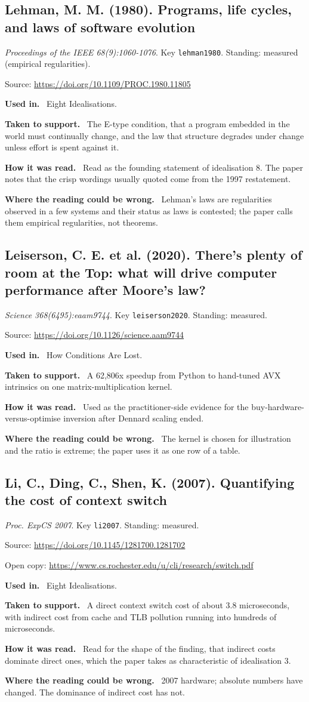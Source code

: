 \documentclass[11pt,oneside]{article}
\newcommand{\field}[1]{\par\noindent\textbf{\color{accent}#1.}\ }
\begin{document}
\subsection*{Lehman, M. M. (1980). Programs, life cycles, and laws of software evolution}
\noindent\small\emph{Proceedings of the IEEE 68(9):1060-1076}. Key \texttt{lehman1980}. Standing: measured (empirical regularities).
\par\noindent\small Source: \url{https://doi.org/10.1109/PROC.1980.11805}
\normalsize
\field{Used in} Eight Idealisations.
\field{Taken to support} The E-type condition, that a program embedded in the world must continually change, and the law that structure degrades under change unless effort is spent against it.
\field{How it was read} Read as the founding statement of idealisation 8. The paper notes that the crisp wordings usually quoted come from the 1997 restatement.
\field{Where the reading could be wrong} Lehman's laws are regularities observed in a few systems and their status as laws is contested; the paper calls them empirical regularities, not theorems.

\hypertarget{src:leiserson2020}{}
\subsection*{Leiserson, C. E. et al. (2020). There's plenty of room at the Top: what will drive computer performance after Moore's law?}
\noindent\small\emph{Science 368(6495):eaam9744}. Key \texttt{leiserson2020}. Standing: measured.
\par\noindent\small Source: \url{https://doi.org/10.1126/science.aam9744}
\normalsize
\field{Used in} How Conditions Are Lost.
\field{Taken to support} A 62,806x speedup from Python to hand-tuned AVX intrinsics on one matrix-multiplication kernel.
\field{How it was read} Used as the practitioner-side evidence for the buy-hardware-versus-optimise inversion after Dennard scaling ended.
\field{Where the reading could be wrong} The kernel is chosen for illustration and the ratio is extreme; the paper uses it as one row of a table.

\hypertarget{src:li2007}{}
\subsection*{Li, C., Ding, C., Shen, K. (2007). Quantifying the cost of context switch}
\noindent\small\emph{Proc. ExpCS 2007}. Key \texttt{li2007}. Standing: measured.
\par\noindent\small Source: \url{https://doi.org/10.1145/1281700.1281702}
\par\noindent\small Open copy: \url{https://www.cs.rochester.edu/u/cli/research/switch.pdf}
\normalsize
\field{Used in} Eight Idealisations.
\field{Taken to support} A direct context switch cost of about 3.8 microseconds, with indirect cost from cache and TLB pollution running into hundreds of microseconds.
\field{How it was read} Read for the shape of the finding, that indirect costs dominate direct ones, which the paper takes as characteristic of idealisation 3.
\field{Where the reading could be wrong} 2007 hardware; absolute numbers have changed. The dominance of indirect cost has not.
\end{document}
